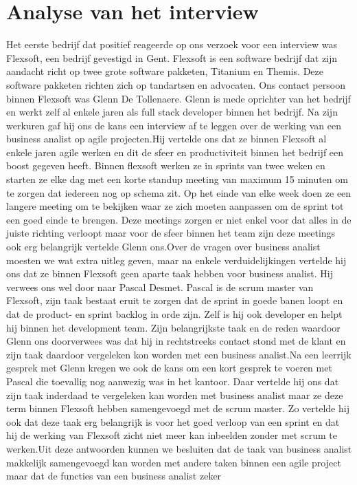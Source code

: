 \documentclass{hogent-article}
\begin{document}
\section{Analyse van het interview}
Het eerste bedrijf dat positief reageerde op ons verzoek voor een interview was Flexsoft, een bedrijf gevestigd in Gent. Flexsoft is een software bedrijf dat zijn aandacht richt op twee grote software pakketen, Titanium en Themis. Deze software pakketen richten zich op tandartsen en advocaten. \newline \newline Ons contact persoon binnen Flexsoft was Glenn De Tollenaere. Glenn is mede oprichter van het bedrijf en werkt zelf al enkele jaren als full stack developer binnen het bedrijf. Na zijn werkuren gaf hij ons de kans een interview af te leggen over de werking van een business analist op agile projecten.\newline \newline Hij vertelde ons dat ze binnen Flexsoft al enkele jaren agile werken en dit de sfeer en productiviteit binnen het bedrijf een boost gegeven heeft. Binnen flexsoft werken ze in sprints van twee weken en starten ze elke dag met een korte standup meeting van maximum 15 minuten om te zorgen dat iedereen nog op schema zit. Op het einde van elke week doen ze een langere meeting om te bekijken waar ze zich moeten aanpassen om de sprint tot een goed einde te brengen. Deze meetings zorgen er niet enkel voor dat alles in de juiste richting verloopt maar voor de sfeer binnen het team zijn deze meetings ook erg belangrijk vertelde Glenn ons.\newline \newline Over de vragen over business analist moesten we wat extra uitleg geven, maar na enkele verduidelijkingen vertelde hij ons dat ze binnen Flexsoft geen aparte taak hebben voor business analist. Hij verwees ons wel door naar Pascal Desmet. Pascal is de scrum master van Flexsoft, zijn taak bestaat eruit te zorgen dat de sprint in goede banen loopt en dat de product- en sprint backlog in orde zijn. Zelf is hij ook developer en helpt hij binnen het development team. Zijn belangrijkste taak en de reden waardoor Glenn ons doorverwees was dat hij in rechtstreeks contact stond met de klant en zijn taak daardoor vergeleken kon worden met een business analist.\newline \newline Na een leerrijk gesprek met Glenn kregen we ook de kans om een kort gesprek te voeren met Pascal die toevallig nog aanwezig was in het kantoor. Daar vertelde hij ons dat zijn taak inderdaad te vergeleken kan worden met business analist maar ze deze term binnen Flexsoft hebben samengevoegd met de scrum master. Zo vertelde hij ook dat deze taak erg belangrijk is voor het goed verloop van een sprint en dat hij de werking van Flexsoft zicht niet meer kan inbeelden zonder met scrum te werken.\newline \newline Uit deze antwoorden kunnen we besluiten dat de taak van business analist makkelijk samengevoegd kan worden met andere taken binnen een agile project maar dat de functies van een business analist zeker 
\end{document}
